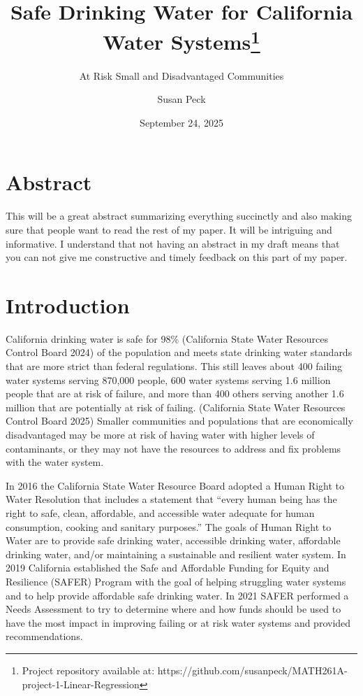 \documentclass[
  letterpaper,
  DIV=11,
  numbers=noendperiod]{scrartcl}
\title{Safe Drinking Water for California Water Systems\thanks{Project
repository available at:
https://github.com/susanpeck/MATH261A-project-1-Linear-Regression}}
\subtitle{At Risk Small and Disadvantaged Communities}
\author{Susan Peck}
\date{September 24, 2025}
\begin{document}
\maketitle


\section{Abstract}\label{sec-abstract}

This will be a great abstract summarizing everything succinctly and also
making sure that people want to read the rest of my paper. It will be
intriguing and informative. I understand that not having an abstract in
my draft means that you can not give me constructive and timely feedback
on this part of my paper.

\section{Introduction}\label{sec-introduction}

California drinking water is safe for 98\% (California State Water
Resources Control Board 2024) of the population and meets state drinking
water standards that are more strict than federal regulations. This
still leaves about 400 failing water systems serving 870,000 people, 600
water systems serving 1.6 million people that are at risk of failure,
and more than 400 others serving another 1.6 million that are
potentially at risk of failing. (California State Water Resources
Control Board 2025) Smaller communities and populations that are
economically disadvantaged may be more at risk of having water with
higher levels of contaminants, or they may not have the resources to
address and fix problems with the water system.

In 2016 the California State Water Resource Board adopted a Human Right
to Water Resolution that includes a statement that ``every human being
has the right to safe, clean, affordable, and accessible water adequate
for human consumption, cooking and sanitary purposes.'' The goals of
Human Right to Water are to provide safe drinking water, accessible
drinking water, affordable drinking water, and/or maintaining a
sustainable and resilient water system. In 2019 California established
the Safe and Affordable Funding for Equity and Resilience (SAFER)
Program with the goal of helping struggling water systems and to help
provide affordable safe drinking water. In 2021 SAFER performed a Needs
Assessment to try to determine where and how funds should be used to
have the most impact in improving failing or at risk water systems and
provided recommendations.
\end{document}

